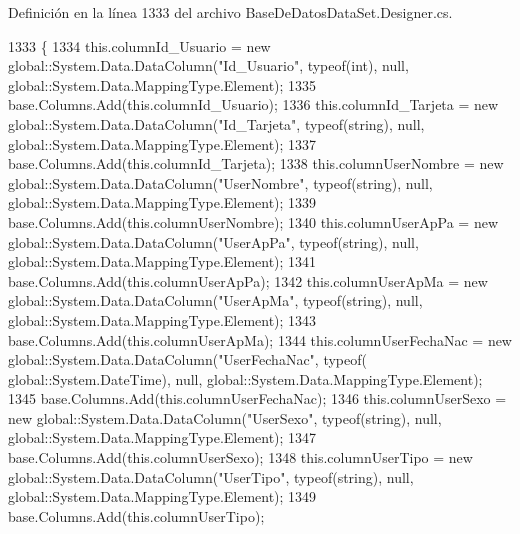 Definición en la línea 1333 del archivo Base\-De\-Datos\-Data\-Set.\-Designer.\-cs.


\begin{DoxyCode}
1333                                      \{
1334                 this.columnId\_Usuario = \textcolor{keyword}{new} global::System.Data.DataColumn(\textcolor{stringliteral}{"Id\_Usuario"}, typeof(\textcolor{keywordtype}{int}), null,
       global::System.Data.MappingType.Element);
1335                 base.Columns.Add(this.columnId\_Usuario);
1336                 this.columnId\_Tarjeta = \textcolor{keyword}{new} global::System.Data.DataColumn(\textcolor{stringliteral}{"Id\_Tarjeta"}, typeof(\textcolor{keywordtype}{string}), 
      null, global::System.Data.MappingType.Element);
1337                 base.Columns.Add(this.columnId\_Tarjeta);
1338                 this.columnUserNombre = \textcolor{keyword}{new} global::System.Data.DataColumn(\textcolor{stringliteral}{"UserNombre"}, typeof(\textcolor{keywordtype}{string}), 
      null, global::System.Data.MappingType.Element);
1339                 base.Columns.Add(this.columnUserNombre);
1340                 this.columnUserApPa = \textcolor{keyword}{new} global::System.Data.DataColumn(\textcolor{stringliteral}{"UserApPa"}, typeof(\textcolor{keywordtype}{string}), null, 
      global::System.Data.MappingType.Element);
1341                 base.Columns.Add(this.columnUserApPa);
1342                 this.columnUserApMa = \textcolor{keyword}{new} global::System.Data.DataColumn(\textcolor{stringliteral}{"UserApMa"}, typeof(\textcolor{keywordtype}{string}), null, 
      global::System.Data.MappingType.Element);
1343                 base.Columns.Add(this.columnUserApMa);
1344                 this.columnUserFechaNac = \textcolor{keyword}{new} global::System.Data.DataColumn(\textcolor{stringliteral}{"UserFechaNac"}, typeof(
      global::System.DateTime), null, global::System.Data.MappingType.Element);
1345                 base.Columns.Add(this.columnUserFechaNac);
1346                 this.columnUserSexo = \textcolor{keyword}{new} global::System.Data.DataColumn(\textcolor{stringliteral}{"UserSexo"}, typeof(\textcolor{keywordtype}{string}), null, 
      global::System.Data.MappingType.Element);
1347                 base.Columns.Add(this.columnUserSexo);
1348                 this.columnUserTipo = \textcolor{keyword}{new} global::System.Data.DataColumn(\textcolor{stringliteral}{"UserTipo"}, typeof(\textcolor{keywordtype}{string}), null, 
      global::System.Data.MappingType.Element);
1349                 base.Columns.Add(this.columnUserTipo);

\end{DoxyCode}
